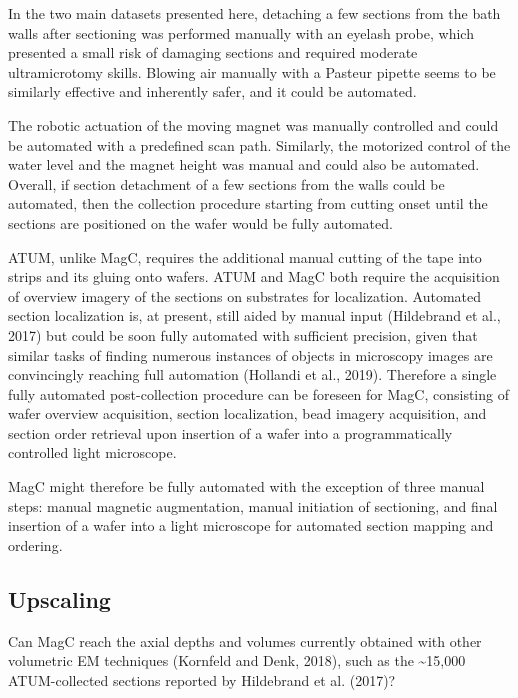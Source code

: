 \documentclass{article}
\begin{document}
In the two main datasets presented here, detaching a few sections from the bath walls after sectioning was performed manually with an eyelash probe, which presented a small risk of damaging sections and required moderate ultramicrotomy skills. Blowing air manually with a Pasteur pipette seems to be similarly effective and inherently safer, and it could be automated.

The robotic actuation of the moving magnet was manually controlled and could be automated with a predefined scan path. Similarly, the motorized control of the water level and the magnet height was manual and could also be automated. Overall, if section detachment of a few sections from the walls could be automated, then the collection procedure starting from cutting onset until the sections are positioned on the wafer would be fully automated.

ATUM, unlike MagC, requires the additional manual cutting of the tape into strips and its gluing onto wafers. ATUM and MagC both require the acquisition of overview imagery of the sections on substrates for localization. Automated section localization is, at present, still aided by manual input (Hildebrand et al., 2017) but could be soon fully automated with sufficient precision, given that similar tasks of finding numerous instances of objects in microscopy images are convincingly reaching full automation (Hollandi et al., 2019). Therefore a single fully automated post-collection procedure can be foreseen for MagC, consisting of wafer overview acquisition, section localization, bead imagery acquisition, and section order retrieval upon insertion of a wafer into a programmatically controlled light microscope.

MagC might therefore be fully automated with the exception of three manual steps: manual magnetic augmentation, manual initiation of sectioning, and final insertion of a wafer into a light microscope for automated section mapping and ordering.

\subsection*{Upscaling}

Can MagC reach the axial depths and volumes currently obtained with other volumetric EM techniques (Kornfeld and Denk, 2018), such as the \textasciitilde15,000 ATUM-collected sections reported by Hildebrand et al. (2017)?
\end{document}
